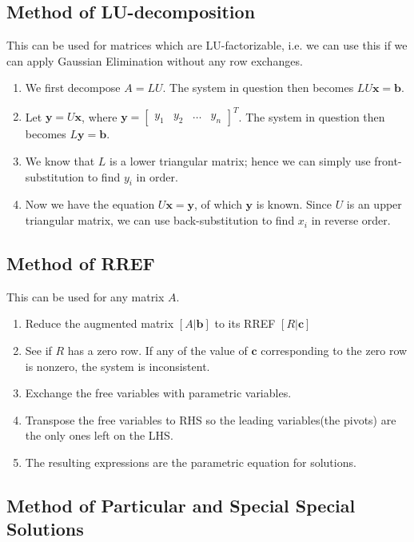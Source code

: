 \documentclass{report}
\begin{document}
		\subsection{Method of LU-decomposition}

			This can be used for matrices which are LU-factorizable, i.e. we can use this if we can apply Gaussian Elimination without any row exchanges.
			
			\begin{enumerate}
				\item We first decompose $A=LU$. The system in question then becomes $LU\bm{x}=\bm{b}$.
				\item Let $\bm{y}=U\bm{x}$, where $\bm{y}=\begin{bmatrix}y_1 & y_2 & \dots & y_n \end{bmatrix}^T$. The system in question then becomes $L\bm{y}=\bm{b}$.
				\item We know that $L$ is a lower triangular matrix; hence we can simply use front-substitution to find $y_i$ in order.
				\item Now we have the equation $U\bm{x}=\bm{y}$, of which $\bm{y}$ is known. Since $U$ is an upper triangular matrix, we can use back-substitution to find $x_i$ in reverse order.
			\end{enumerate}
		
		\subsection{Method of RREF}\label{mthd_rref}
		
		This can be used for any matrix $A$.
		
		\begin{enumerate}
			\item Reduce the augmented matrix $\left[A|\bm{b}\right]$ to its RREF $\left[R|\bm{c}\right]$
			\item See if $R$ has a zero row. If any of the value of $\bm{c}$ corresponding to the zero row is nonzero, the system is inconsistent.
			\item Exchange the free variables with parametric variables.
			\item Transpose the free variables to RHS so the leading variables(the pivots) are the only ones left on the LHS.
			\item The resulting expressions are the parametric equation for solutions.
		\end{enumerate}
		
		\subsection{Method of Particular and Special Special Solutions}
			
\end{document}
